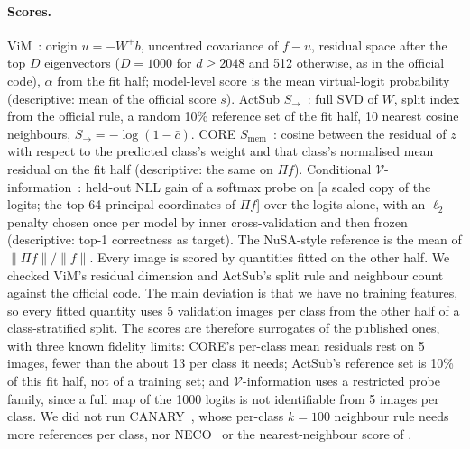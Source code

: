 \documentclass[10pt]{article}
\begin{document}
\paragraph{Scores.} ViM~\citep{vim2022}: origin $u{=}{-}W^{+}b$, uncentred covariance of $f{-}u$, residual space after the top $D$ eigenvectors ($D{=}1000$ for $d\ge2048$ and 512 otherwise, as in the official code), $\alpha$ from the fit half; model-level score is the mean virtual-logit probability (descriptive: mean of the official score $s$). ActSub $S_{\to}$~\citep{zongur2025actsub}: full SVD of $W$, split index from the official rule, a random 10\% reference set of the fit half, 10 nearest cosine neighbours, $S_{\to}{=}{-}\log(1-\bar{c})$. CORE $S_{\mathrm{mem}}$~\citep{yang2026core}: cosine between the residual of $z$ with respect to the predicted class's weight and that class's normalised mean residual on the fit half (descriptive: the same on $\Pi f$). Conditional $\mathcal{V}$-information~\citep{hewitt2021conditional}: held-out NLL gain of a softmax probe on [a scaled copy of the logits; the top 64 principal coordinates of $\Pi f$] over the logits alone, with an $\ell_2$ penalty chosen once per model by inner cross-validation and then frozen (descriptive: top-1 correctness as target). The NuSA-style reference is the mean of $\|\Pi f\|/\|f\|$. Every image is scored by quantities fitted on the other half.
We checked ViM's residual dimension and ActSub's split rule and neighbour count against the official code. The main deviation is that we have no training features, so every fitted quantity uses 5 validation images per class from the other half of a class-stratified split. The scores are therefore surrogates of the published ones, with three known fidelity limits: CORE's per-class mean residuals rest on 5 images, fewer than the about 13 per class it needs; ActSub's reference set is 10\% of this fit half, not of a training set; and $\mathcal{V}$-information uses a restricted probe family, since a full map of the 1000 logits is not identifiable from 5 images per class. We did not run CANARY~\citep{shin2026canary}, whose per-class $k{=}100$ neighbour rule needs more references per class, nor NECO~\citep{ammar2024neco} or the nearest-neighbour score of \citet{sun2022knn}.
\end{document}

